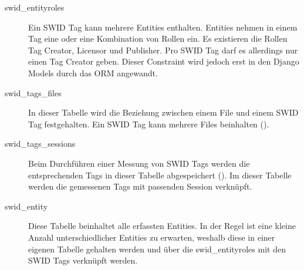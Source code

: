 \begin{description}
\item [swid\_entityroles] Ein SWID Tag kann mehrere Entities enthalten. Entities 
nehmen in einem Tag eine oder eine Kombination von Rollen ein. Es
existieren die Rollen Tag Creator, Licensor und Publisher. Pro SWID Tag darf es
allerdings nur einen Tag Creator geben. Dieser Constraint wird jedoch erst in
den Django Models durch das \gls{ORM} angewandt.

\item [swid\_tags\_files] In dieser Tabelle wird die Beziehung zwischen einem
File und einem SWID Tag festgehalten. Ein SWID Tag kann mehrere Files beinhalten
().

\item[swid\_tags\_sessions] Beim Durchführen einer Messung von SWID Tags werden
die entsprechenden Tags in dieser Tabelle abgespeichert
(). Im dieser Tabelle werden die gemessenen Tags mit
passenden Session verknüpft.

\item[swid\_entity] Diese Tabelle beinhaltet alle erfassten Entities. In der
Regel ist eine kleine Anzahl unterschiedlicher Entities zu erwarten, weshalb
diese in einer eigenen Tabelle gehalten werden und über die swid\_entityroles
mit den SWID Tags verknüpft werden.

\end{description}

